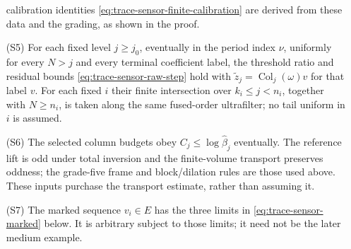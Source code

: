 \begin{enumerate}
  calibration identities \eqref{eq:trace-sensor-finite-calibration} are
  derived from these data and the grading, as shown in the proof.
\item[(S5)] For each fixed level $j\ge j_0$, eventually in the period
  index $\nu$, uniformly for every $N>j$ and every terminal coefficient
  label, the threshold ratio and residual bounds
  \eqref{eq:trace-sensor-raw-step} hold with
  $\widetilde z_j=\operatorname{Col}_j(\omega)v$ for that label $v$.
  For each fixed $i$ their finite
  intersection over $k_i\le j<n_i$, together with $N\ge n_i$, is taken
  along the same fused-order ultrafilter; no tail uniform in $i$ is assumed.
\item[(S6)] The selected column budgets obey $C_j\le\log\widehat\beta_j$
  eventually. The reference lift is odd under total inversion and the
  finite-volume transport preserves oddness; the grade-five frame and
  block/dilation rules are those used above. These inputs purchase the
  transport estimate, rather than assuming it.
\item[(S7)] The marked sequence $v_i\in E$ has the three limits in
  \eqref{eq:trace-sensor-marked} below. It is arbitrary subject to those
  limits; it need not be the later medium example.
\end{enumerate}

